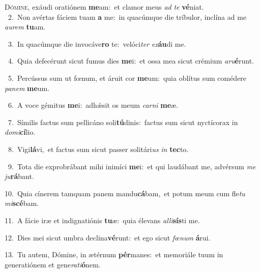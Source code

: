 \lettrine{\initial\textcolor{\initialcolor}{D}}{ómine,} exáudi oratiónem \textbf{me}\-am:~\star et clamor meus \textit{ad} \textit{te} \textbf{vé}\-niat.\\
{\numbfont\textcolor{\numbcolor}{~2.}}~Non avértas fáciem tuam \textbf{a} me:~\star in quacúmque die tríbulor, inclína ad me \textit{au}\-\textit{rem} \textbf{tu}\-am.\par
{\numbfont\textcolor{\numbcolor}{~3.}}~In quacúmque die invocáve\textbf{ro} te:~\star velóci\textit{ter} \textit{ex}\-\textbf{áu}di me.\par
{\numbfont\textcolor{\numbcolor}{~4.}}~Quia defecérunt sicut fumus dies \textbf{me}\-i:~\star et ossa mea sicut crémium \textit{a}\-\textit{ru}\textbf{é}runt.\par
{\numbfont\textcolor{\numbcolor}{~5.}}~Percússus sum ut fœnum, et áruit cor \textbf{me}\-um:~\star quia oblítus sum comédere \textit{pa}\-\textit{nem} \textbf{me}\-um.\par
{\numbfont\textcolor{\numbcolor}{~6.}}~A voce gémitus \textbf{me}\-i:~\star adhǽsit os meum \textit{car}\-\textit{ni} \textbf{me}\-æ.\par
{\numbfont\textcolor{\numbcolor}{~7.}}~Símilis factus sum pellicáno soli\-\textbf{tú}\-dinis:~\star factus sum sicut nyctícorax in \textit{do}\-\textit{mi}\textbf{cí}lio.\par
{\numbfont\textcolor{\numbcolor}{~8.}}~Vigi\-\textbf{lá}\-vi,~\star et factus sum sicut passer solitári\textit{us} \textit{in} \textbf{tec}\-to.\par
{\numbfont\textcolor{\numbcolor}{~9.}}~Tota die exprobrábant mihi inimíci \textbf{me}\-i:~\star et qui laudábant me, advérsum \textit{me} \textit{ju}\-\textbf{rá}bant.\par
{\numbfont\textcolor{\numbcolor}{10.}}~Quia cínerem tamquam panem mandu\-\textbf{cá}\-bam,~\star et potum meum cum fle\textit{tu} \textit{mi}\-\textbf{scé}bam.\par
{\numbfont\textcolor{\numbcolor}{11.}}~A fácie iræ et indignatiónis \textbf{tu}\-æ:~\star quia élevans \textit{al}\-\textit{li}\textbf{sís}ti me.\par
{\numbfont\textcolor{\numbcolor}{12.}}~Dies mei sicut umbra declina\-\textbf{vé}\-runt:~\star et ego sicut \textit{fœ}\-\textit{num} \textbf{á}\-rui.\par
{\numbfont\textcolor{\numbcolor}{13.}}~Tu autem, Dómine, in ætérnum \textbf{pér}\-manes:~\star et memoriále tuum in generatiónem et gene\-\textit{ra}\-\textit{ti}\textbf{ó}nem.\par
